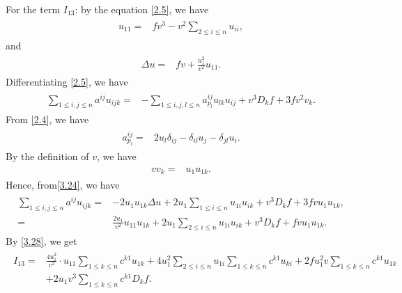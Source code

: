 \documentclass[11pt]{amsart}
\numberwithin{equation}{section}
\begin{document}
For the term $I_{13}$:
by the equation \eqref{2.5}, we have
\begin{align}\label{3.23}
\begin{split}
u_{11}=&fv^3-v^2\sum_{2\leq i\leq n}u_{ii},
\end{split}
\end{align}
and
\begin{align}\label{3.24}
\begin{split}
\Delta u=&fv+\frac{u_1^2}{v^2}u_{11}.
\end{split}
\end{align}
Differentiating \eqref{2.5}, we have
\begin{align}\label{3.25}
\begin{split}
\sum_{1\leq i,j\leq n}a^{ij}u_{ijk}=&-\sum_{1\leq i,j,l\leq n}a^{ij}_{p_l}u_{lk}u_{ij}+v^3D_{k}f+3fv^2v_k.
\end{split}
\end{align}
From \eqref{2.4}, we have
\begin{align}\label{3.26}
\begin{split}
a^{ij}_{p_l}=&2u_l\delta_{ij}-\delta_{il}u_j-\delta_{jl}u_i.
\end{split}
\end{align}
By the definition of $v$, we have
\begin{align}\label{3.27}
\begin{split}
v v_k=&u_1u_{1k}.
\end{split}
\end{align}
Hence, from\eqref{3.24}, we have
\begin{align}\label{3.28}
\begin{split}
\sum_{1\leq i,j\leq n}a^{ij}u_{ijk}
=&-2u_1u_{1k}\Delta u+2u_1\sum_{1\leq i\leq n}u_{1i}u_{ik}+v^3D_{k}f+3fvu_1u_{1k},\\
=&\frac{2u_1}{v^2}u_{11}u_{1k}+2u_1\sum_{2\leq i\leq n}u_{1i}u_{ik}+v^3D_{k}f+fvu_1u_{1k}.
\end{split}
\end{align}
By \eqref{3.28}, we get
\begin{align}\label{3.29}
\begin{split}
I_{13}
=&\frac{4 u_1^2}{v^2}\cdot u_{11}\sum_{1\leq k\leq n}c^{k1}u_{1k}
+4u_1^2\sum_{2\leq i\leq n}u_{1i}\sum_{1\leq k\leq n}c^{k1}u_{ki}+2fu_1^2v\sum_{1\leq k\leq n}c^{k1}u_{1k}\\&+2u_1v^3\sum_{1\leq k\leq n}c^{k1}D_{k}f.
\end{split}
\end{align}
\end{document}
